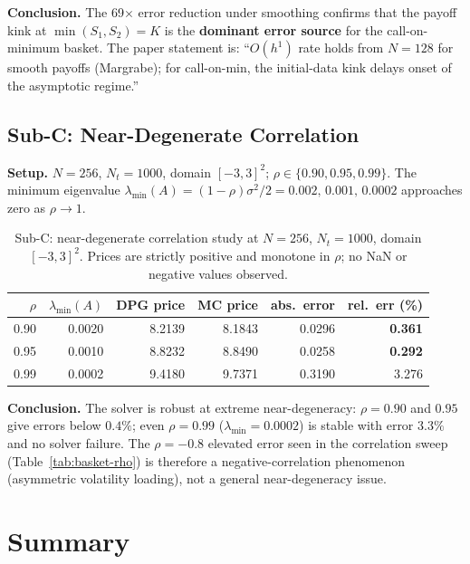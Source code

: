 \documentclass[11pt,a4paper]{article}
\begin{document}
\textbf{Conclusion.}
The 69$\times$ error reduction under smoothing confirms that the payoff kink
at $\min(S_1,S_2)=K$ is the \textbf{dominant error source} for the
call-on-minimum basket.
The paper statement is: ``$O(h^1)$ rate holds from $N=128$ for smooth
payoffs (Margrabe); for call-on-min, the initial-data kink delays onset of
the asymptotic regime.''

\subsection{Sub-C: Near-Degenerate Correlation}
\label{sec:diag-degenerate}

\textbf{Setup.}  $N=256$, $N_t=1000$, domain $[-3,3]^2$;
$\rho \in \{0.90, 0.95, 0.99\}$.
The minimum eigenvalue $\lambda_{\min}(A) = (1-\rho)\sigma^2/2 = 0.002,\,0.001,\,0.0002$
approaches zero as $\rho\to1$.

\begin{table}[htbp]
\centering
\caption{Sub-C: near-degenerate correlation study at $N=256$,
  $N_t=1000$, domain $[-3,3]^2$.
  Prices are strictly positive and monotone in $\rho$; no NaN or negative
  values observed.}
\label{tab:diag-degenerate}
\begin{tabular}{rrrrrr}
\toprule
$\rho$ & $\lambda_{\min}(A)$ & DPG price & MC price & abs.\ error & rel.\ err (\%) \\
\midrule
  0.90 & 0.0020 & 8.2139 & 8.1843 & 0.0296 & \textbf{0.361} \\
  0.95 & 0.0010 & 8.8232 & 8.8490 & 0.0258 & \textbf{0.292} \\
  0.99 & 0.0002 & 9.4180 & 9.7371 & 0.3190 & 3.276 \\
\bottomrule
\end{tabular}
\end{table}

\textbf{Conclusion.}
The solver is robust at extreme near-degeneracy: $\rho=0.90$ and $0.95$
give errors below $0.4\%$; even $\rho=0.99$ ($\lambda_{\min}=0.0002$)
is stable with error $3.3\%$ and no solver failure.
The $\rho=-0.8$ elevated error seen in the correlation sweep (Table~\ref{tab:basket-rho})
is therefore a negative-correlation phenomenon (asymmetric volatility loading),
not a general near-degeneracy issue.

\section{Summary}
\label{sec:summary}
\end{document}
